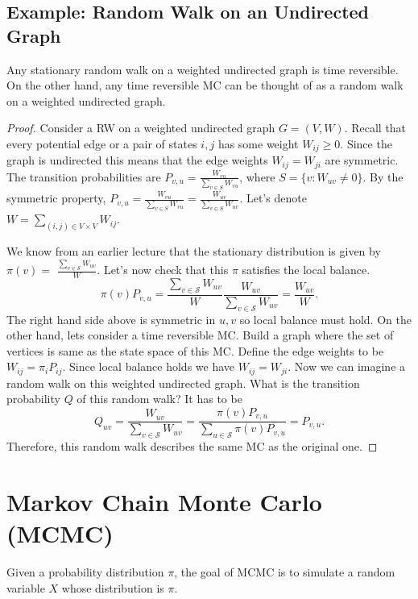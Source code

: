 \documentclass[11pt]{elegantbook}
\begin{document}
\section{Example: Random Walk on an Undirected Graph}
\begin{lemma}
    Any stationary random walk on a weighted undirected graph is time reversible. On the other hand, any time reversible MC can be thought of as a random walk on a weighted undirected graph.
\end{lemma}
\begin{proof}
    Consider a RW on a weighted undirected graph $G=(V, W)$. Recall that every potential edge or a pair of states $i, j$ has some weight $W_{i j} \geq 0$. Since the graph is undirected this means that the edge weights $W_{i j}=W_{j i}$ are symmetric. The transition probabilities are $P_{v,u}=\frac{W_{vu}}{\sum_{v\in S} W_{vu}}$, where $S=\{v: W_{uv}\neq 0\}$. By the symmetric property, $P_{v,u}=\frac{W_{vu}}{\sum_{v\in S} W_{vu}}=\frac{W_{uv}}{\sum_{v\in S} W_{uv}}$. Let's denote $W=\sum_{(i, j) \in V \times V} W_{i j}$.

    We know from an earlier lecture that the stationary distribution is given by $\pi(v)=$ $\frac{\sum_{v \in \mathcal{S}} W_{u v}}{W}$. Let's now check that this $\pi$ satisfies the local balance.
    $$
    \pi(v) P_{v, u}=\frac{\sum_{v \in \mathcal{S}} W_{u v}}{W} \frac{W_{u v}}{\sum_{v \in \mathcal{S}} W_{u v}}=\frac{W_{u v}}{W} .
    $$
    The right hand side above is symmetric in $u, v$ so local balance must hold.
    On the other hand, lets consider a time reversible MC. Build a graph where the set of vertices is same as the state space of this MC. Define the edge weights to be $W_{i j}=\pi_i P_{i j}$. Since local balance holds we have $W_{i j}=W_{j i}$. Now we can imagine a random walk on this weighted undirected graph. What is the transition probability $Q$ of this random walk? It has to be
    $$
    Q_{u v}=\frac{W_{u v}}{\sum_{v \in \mathcal{S}} W_{u v}}=\frac{\pi(v) P_{v, u}}{\sum_{u \in \mathcal{S}} \pi(v) P_{v, u}}=P_{v, u} .
    $$
    Therefore, this random walk describes the same $\mathrm{MC}$ as the original one.

\end{proof}





\chapter{Markov Chain Monte Carlo (MCMC)}
Given a probability distribution $\pi$, the goal of MCMC is to simulate a random variable $X$ whose distribution is $\pi$.
\end{document}
